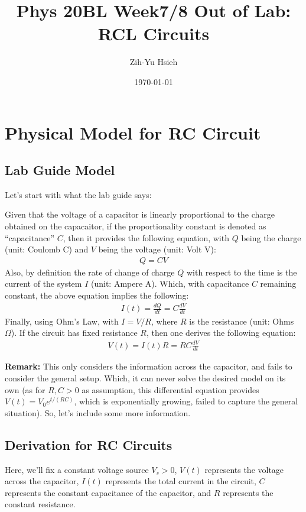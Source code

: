 \documentclass{article}
\title{Phys 20BL Week7/8 Out of Lab: RCL Circuits}
\author{Zih-Yu Hsieh}
\date{\today}
\begin{document}
\maketitle

\tableofcontents

\newpage

\section{Physical Model for RC Circuit}
\subsection{Lab Guide Model}
Let's start with what the lab guide says:

Given that the voltage of a capacitor is linearly proportional to the charge obtained on the capacaitor, if the proportionality constant is denoted as ``capacitance'' $C$, then it provides the following equation, with $Q$ being the charge (unit: Coulomb C) and $V$ being the voltage (unit: Volt V):
\begin{align}
    Q=CV
\end{align}
Also, by definition the rate of change of charge $Q$ with respect to the time is the current of the system $I$ (unit: Ampere A). Which, with capacitance $C$ remaining constant, the above equation implies the following:
\begin{align}
    I(t)=\frac{dQ}{dt} = C\frac{dV}{dt}
\end{align}
Finally, using Ohm's Law, with $I=V/R$, where $R$ is the resistance (unit: Ohms $\Omega$). If the circuit has fixed resistance $R$, then one derives the following equation:
\begin{align}
    V(t)=I(t)R = RC \frac{dV}{dt}
\end{align}

\textbf{Remark:} This only considers the information across the capacitor, and fails to consider the general setup. Which, it can never solve the desired model on its own (as for $R,C>0$ as assumption, this differential equation provides $V(t)=V_0e^{t/(R C)}$, which is exponentially growing, failed to capture the general situation). So, let's include some more information.

\hfil

\subsection{Derivation for RC Circuits}
Here, we'll fix a constant voltage source $V_s>0$, $V(t)$ represents the voltage across the capacitor, $I(t)$ represents the total current in the circuit, $C$ represents the constant capacitance of the capacitor, and $R$ represents the constant resistance. 
\end{document}
